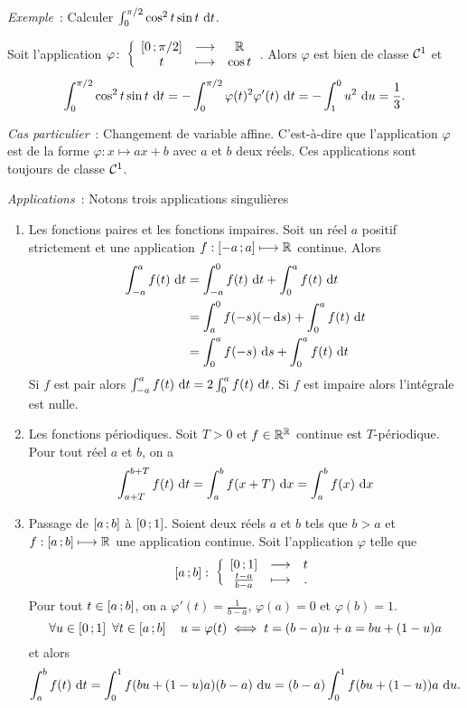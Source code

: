 \emph{Exemple}~: Calculer $\int_0^{\pi/2} \cos^2 t \sin t\,\mathop{}\mathopen{}\mathrm{d} t$. 

Soit l'application $\varphi\colon \left\{\begin{array}{ccc} \left[ 0 \, ;  \pi/2 \right] & \longrightarrow &\mathbb{R}\\ t & \longmapsto & \cos t \end{array} \right.$. Alors $\varphi$ est bien de classe $\mathcal{C}^{1}$ et
\begin{equation}
  \int_0^{\pi/2} \cos^2 t \sin t\,\mathop{}\mathopen{}\mathrm{d} t = -\int_0^{\pi/2} \varphi(t)^2\varphi'(t)\,\mathop{}\mathopen{}\mathrm{d} t = -\int_1^0 u^2\,\mathop{}\mathopen{}\mathrm{d} u =\frac{1}{3}.
\end{equation}


\emph{Cas particulier}~: Changement de variable affine. C'est-à-dire que l'application $\varphi$ est de la forme $\varphi : x \longmapsto ax+b$ avec $a$ et $b$ deux réels. Ces applications sont toujours de classe $\mathcal{C}^{1}$.

\emph{Applications}~: Notons trois applications singulières
\begin{enumerate}
\item Les fonctions paires et les fonctions impaires. Soit un réel $a$ positif strictement et une application $f : \left[ -a \, ;  a \right] \longmapsto \mathbb{R}$ continue. Alors
  \begin{align}
    \int_{-a}^a f(t)\,\mathop{}\mathopen{}\mathrm{d} t &=\int_{-a}^0 f(t)\,\mathop{}\mathopen{}\mathrm{d} t + \int_{0}^a f(t)\,\mathop{}\mathopen{}\mathrm{d} t \\
    &=\int_a^0 f(-s)(-\mathop{}\mathopen{}\mathrm{d} s) + \int_{0}^a f(t)\,\mathop{}\mathopen{}\mathrm{d} t \\
    &=\int_0^a f(-s)\,\mathop{}\mathopen{}\mathrm{d} s + \int_{0}^a f(t)\,\mathop{}\mathopen{}\mathrm{d} t \\
  \end{align}
  Si $f$ est pair alors $\int_{-a}^a f(t)\,\mathop{}\mathopen{}\mathrm{d} t = 2 \int_{0}^a f(t)\,\mathop{}\mathopen{}\mathrm{d} t$. Si $f$ est impaire alors l'intégrale est nulle.

\item Les fonctions périodiques. Soit $T >0$ et $f \in \mathbb{R}^{\mathbb{R}}$ continue est $T$-périodique. Pour tout réel $a$ et $b$, on a
  \begin{equation}
    \int_{a+T}^{b+T} f(t)\,\mathop{}\mathopen{}\mathrm{d} t = \int_a^bf(x+T)\,\mathop{}\mathopen{}\mathrm{d} x = \int_a^bf(x)\,\mathop{}\mathopen{}\mathrm{d} x
  \end{equation}
\item Passage de $\left[ a \, ;  b \right]$ à $\left[ 0 \, ;  1 \right]$. Soient deux réels $a$ et $b$ tels que $b>a$ et $f:\left[ a \, ;  b \right] \longmapsto \mathbb{R}$ une application continue. Soit l'application $\varphi$ telle que
  \begin{equation}
    \left[ a \, ;  b \right]\colon \left\{\begin{array}{ccc} \left[ 0 \, ;  1 \right] & \longrightarrow &t\\ \frac{t-a}{b-a} & \longmapsto & . \end{array} \right.
  \end{equation}
  Pour tout $t \in \left[ a \, ;  b \right]$, on a $\varphi'(t) = \frac{1}{b-a}$, $\varphi(a)=0$ et $\varphi(b)=1$.
  \begin{equation}
    \forall u \in \left[ 0 \, ;  1 \right] \ \forall t \in \left[ a \, ;  b \right] \quad u=\varphi(t) \iff t=(b-a)u +a = bu +(1-u)a
  \end{equation}
  et alors
  \begin{equation}
    \int_a^b f(t)\,\mathop{}\mathopen{}\mathrm{d} t = \int_0^1 f(bu+(1-u)a)(b-a)\,\mathop{}\mathopen{}\mathrm{d} u = (b-a) \int_0^1 f(bu+(1-u))a\,\mathop{}\mathopen{}\mathrm{d} u.
  \end{equation}
\end{enumerate}

